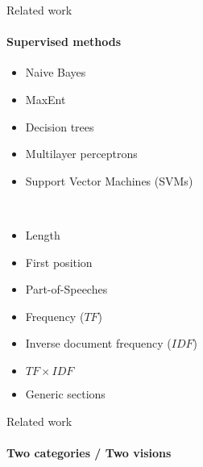   \begin{frame}{Related work}
    \framesubtitle{Supervised methods}

    \begin{itemize}
      \item<+->{Naive Bayes\hfill\cite{witten1999kea}}
      \item<+->{MaxEnt\hfill\cite{sujian2003maximumentropy}}
      \item<+->{Decision trees\hfill\cite{ercan2007lexicalchains}}
      \item<+->{Multilayer perceptrons\hfill\cite{sarkar2010neuralnetwork}}
      \item<+->{Support Vector Machines (SVMs)\hfill\cite{zhang2006svm}}
    \end{itemize}~\\

    \vspace{-.75em}
    \begin{multicols}{3}
      \begin{itemize}
        \item<+->{Length}
        \item<+->{First position}
        \item<+->{Part-of-Speeches}
        \item<+->{Frequency ($TF$)}
        \item<+->{Inverse document frequency ($IDF$)}
        \item<+->{$TF \times IDF$}
        \item<+->{Generic sections}
      \end{itemize}
    \end{multicols}

  \end{frame}

  \begin{frame}{Related work}
    \framesubtitle{Two categories / Two visions}



  \end{frame}

